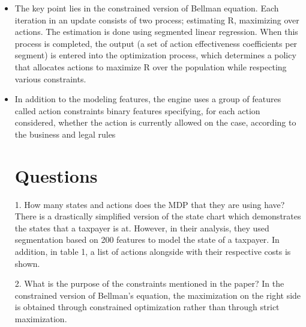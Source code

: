 \documentclass{article}
\theoremstyle{remark}
\theoremstyle{remark}
\theoremstyle{remark}
\theoremstyle{remark}
\theoremstyle{remark}
\theoremstyle{remark}
\begin{document}
\begin{itemize}
	\item The key point lies in the constrained version of Bellman equation. Each iteration in an update consists of two process; estimating R, maximizing over actions. The estimation is done using segmented linear regression. When this process is completed, the output (a set of action effectiveness coefficients per segment) is entered into the optimization process, which determines a policy that allocates actions to maximize R over the population while respecting various constraints.
	\item In addition to the modeling features, the engine uses a group of features called action constraints binary features specifying, for each action considered, whether the action is currently allowed on the case, according to the business and legal rules

\section{Questions}
1. How many states and actions does the MDP that they are using have?
There is a drastically simplified version of the state chart which demonstrates the states that a taxpayer is at. However, in their analysis, they used segmentation based on 200 features to model the state of a taxpayer. In addition, in table 1, a list of actions alongside with their respective costs is shown.

2. What is the purpose of the constraints mentioned in the paper?
In the constrained version of Bellman’s equation, the maximization on the right side is obtained through constrained optimization rather than through strict maximization.

\end{itemize}




\end{document}
